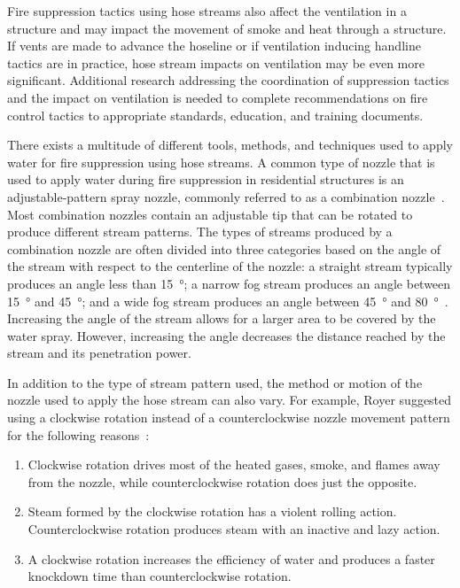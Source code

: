\documentclass[12pt,oneside]{book}
\begin{document}
Fire suppression tactics using hose streams also affect the ventilation in a structure and may impact the movement of smoke and heat through a structure. If vents are made to advance the hoseline or if ventilation inducing handline tactics are in practice, hose stream impacts on ventilation may be even more significant. Additional research addressing the coordination of suppression tactics and the impact on ventilation is needed to complete recommendations on fire control tactics to appropriate standards, education, and training documents.

There exists a multitude of different tools, methods, and techniques used to apply water for fire suppression using hose streams. A common type of nozzle that is used to apply water during fire suppression in residential structures is an adjustable-pattern spray nozzle, commonly referred to as a combination nozzle~\cite{NFPA_1964}. Most combination nozzles contain an adjustable tip that can be rotated to produce different stream patterns. The types of streams produced by a combination nozzle are often divided into three categories based on the angle of the stream with respect to the centerline of the nozzle: a straight stream typically produces an angle less than 15\SI{}{\degree}; a narrow fog stream produces an angle between 15\SI{}{\degree} and 45\SI{}{\degree}; and a wide fog stream produces an angle between 45\SI{}{\degree} and 80\SI{}{\degree}~\cite{IFSTA:Essentials_of_FF}. Increasing the angle of the stream allows for a larger area to be covered by the water spray.  However, increasing the angle decreases the distance reached by the stream and its penetration power. 

In addition to the type of stream pattern used, the method or motion of the nozzle used to apply the hose stream can also vary. For example, Royer suggested using a clockwise rotation instead of a counterclockwise nozzle movement pattern for the following reasons~\cite{Royer:ISU}:
\begin{enumerate} 
	\item Clockwise rotation drives most of the heated gases, smoke, and flames away from the nozzle, while counterclockwise rotation does just the opposite.
	\item Steam formed by the clockwise rotation has a violent rolling action. Counterclockwise rotation produces steam with an inactive and lazy action.
	\item A clockwise rotation increases the efficiency of water and produces a faster knockdown time than counterclockwise rotation.
\end{enumerate}
\end{document}
